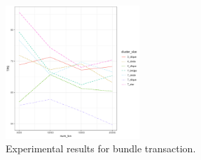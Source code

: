 \begin{figure}[!ht]
\begin{center}
\includegraphics[height=0.35\textwidth, width=0.45\textwidth]{figures/multi_txn.pdf}
    \caption{
        Experimental results for bundle transaction.
     }
\label{multi_txn}
\end{center}
\end{figure}


